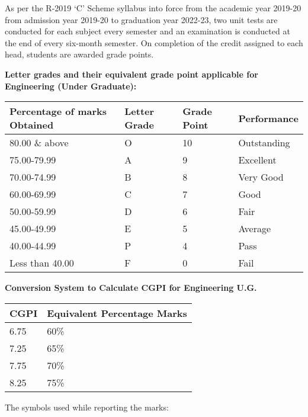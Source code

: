 \documentclass{article} %
\begin{document}
\noindent 

\noindent As per the R-2019 `C' Scheme syllabus into force from the academic year 2019-20 from admission year 2019-20 to graduation year 2022-23, two unit tests are conducted for each subject every semester and an examination is conducted at the end of every six-month semester. On completion of the credit assigned to each head, students are awarded grade points.

\noindent 

\noindent \textbf{Letter grades and their equivalent grade point applicable for Engineering (Under Graduate):}

\noindent \textbf{}

\begin{tabular}{|p{1.0in}|p{1.0in}|p{1.0in}|p{1.0in}|} \hline 
\textbf{Percentage of marks Obtained} & \textbf{Letter Grade} & \textbf{Grade Point} & \textbf{Performance} \\ \hline 
80.00 \& above & O & 10 & Outstanding \\ \hline 
75.00-79.99 & A & 9 & Excellent \\ \hline 
70.00-74.99 & B & 8 & Very Good \\ \hline 
60.00-69.99 & C & 7 & Good \\ \hline 
50.00-59.99 & D & 6 & Fair \\ \hline 
45.00-49.99 & E & 5 & Average \\ \hline 
40.00-44.99 & P & 4 & Pass \\ \hline 
Less than 40.00 & F & 0 & Fail \\ \hline 
\end{tabular}

\textbf{}

\noindent \textbf{Conversion System to Calculate CGPI for Engineering U.G.}

\noindent \textbf{}

\begin{tabular}{|p{2.6in}|p{1.5in}|} \hline 
\textbf{CGPI} & \textbf{Equivalent Percentage Marks} \\ \hline 
6.75 & 60\% \\ \hline 
7.25 & 65\% \\ \hline 
7.75\textbf{} & 70\% \\ \hline 
8.25 & 75\% \\ \hline 
\end{tabular}

\textbf{}

\noindent The symbols used while reporting the marks:
\end{document}
